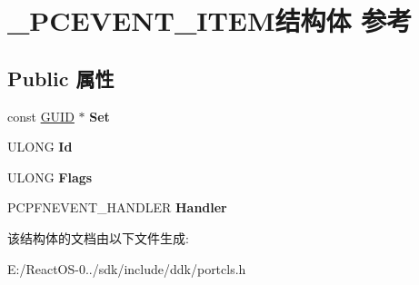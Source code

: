 \hypertarget{struct___p_c_e_v_e_n_t___i_t_e_m}{}\section{\+\_\+\+P\+C\+E\+V\+E\+N\+T\+\_\+\+I\+T\+E\+M结构体 参考}
\label{struct___p_c_e_v_e_n_t___i_t_e_m}
\subsection*{Public 属性}
\begin{DoxyCompactItemize}
\item 
\mbox{\label{struct___p_c_e_v_e_n_t___i_t_e_m_af3a556824907f1c67ed6aa49abf38c6c}} 
const \hyperlink{interface_g_u_i_d}{G\+U\+ID} $\ast$ {\bfseries Set}
\item 
\mbox{\label{struct___p_c_e_v_e_n_t___i_t_e_m_acd43d719e7e8f38c092379ba21f7b202}} 
U\+L\+O\+NG {\bfseries Id}
\item 
\mbox{\label{struct___p_c_e_v_e_n_t___i_t_e_m_a7be0e846cc5889ee60891a06e9f0648b}} 
U\+L\+O\+NG {\bfseries Flags}
\item 
\mbox{\label{struct___p_c_e_v_e_n_t___i_t_e_m_a5c4e137807f0e617c0fa0094990d9f6d}} 
P\+C\+P\+F\+N\+E\+V\+E\+N\+T\+\_\+\+H\+A\+N\+D\+L\+ER {\bfseries Handler}
\end{DoxyCompactItemize}


该结构体的文档由以下文件生成\+:\begin{DoxyCompactItemize}
\item 
E\+:/\+React\+O\+S-\/0../sdk/include/ddk/portcls.\+h\end{DoxyCompactItemize}
